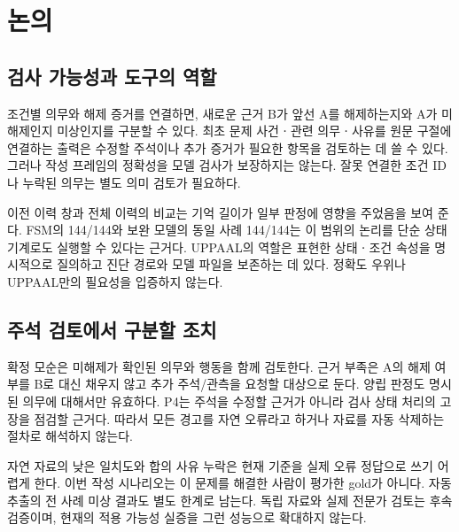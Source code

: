 \section{논의}
\label{sec:discussion}

\begin{revision}

\subsection{검사 가능성과 도구의 역할}
조건별 의무와 해제 증거를 연결하면, 새로운 근거 B가 앞선 A를 해제하는지와 A가 미해제인지 미상인지를 구분할 수 있다. 최초 문제 사건ㆍ관련 의무ㆍ사유를 원문 구절에 연결하는 출력은 수정할 주석이나 추가 증거가 필요한 항목을 검토하는 데 쓸 수 있다. 그러나 작성 프레임의 정확성을 모델 검사가 보장하지는 않는다. 잘못 연결한 조건 ID나 누락된 의무는 별도 의미 검토가 필요하다.

이전 이력 창과 전체 이력의 비교는 기억 길이가 일부 판정에 영향을 주었음을 보여 준다. FSM의 144/144와 보완 모델의 동일 사례 144/144는 이 범위의 논리를 단순 상태 기계로도 실행할 수 있다는 근거다. UPPAAL의 역할은 표현한 상태ㆍ조건 속성을 명시적으로 질의하고 진단 경로와 모델 파일을 보존하는 데 있다. 정확도 우위나 UPPAAL만의 필요성을 입증하지 않는다.

\subsection{주석 검토에서 구분할 조치}
확정 모순은 미해제가 확인된 의무와 행동을 함께 검토한다. 근거 부족은 A의 해제 여부를 B로 대신 채우지 않고 추가 주석/관측을 요청할 대상으로 둔다. 양립 판정도 명시된 의무에 대해서만 유효하다. P4는 주석을 수정할 근거가 아니라 검사 상태 처리의 고장을 점검할 근거다. 따라서 모든 경고를 자연 오류라고 하거나 자료를 자동 삭제하는 절차로 해석하지 않는다.

자연 자료의 낮은 일치도와 합의 사유 누락은 현재 기준을 실제 오류 정답으로 쓰기 어렵게 한다. 이번 작성 시나리오는 이 문제를 해결한 사람이 평가한 gold가 아니다. 자동 추출의 전 사례 미상 결과도 별도 한계로 남는다. 독립 자료와 실제 전문가 검토는 후속 검증이며, 현재의 적용 가능성 실증을 그런 성능으로 확대하지 않는다.
\end{revision}
